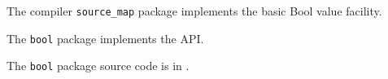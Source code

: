 
The compiler {\tt source\_map} package implements the basic Bool value facility.

The {\tt bool} package implements the  API.

The {\tt bool} package source code is in .



